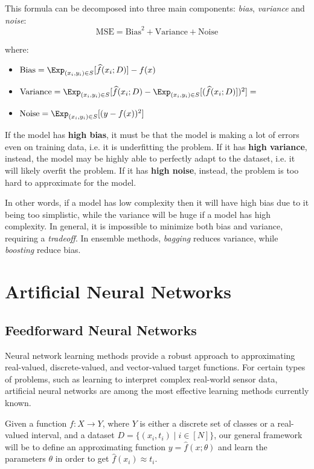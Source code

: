 \documentclass[a4paper, 12pt]{report}
\begin{document}
    This formula can be decomposed into three main components: \textit{bias}, \textit{variance} and \textit{noise}:
    \[\mathrm{MSE} = \mathrm{Bias}^2 + \mathrm{Variance} + \mathrm{Noise}\]

    where:
    \begin{itemize}
        \item $\mathrm{Bias} = \Exp_{(x_i, y_i) \in S}[\widehat{f}(x_i; D)] - f(x)$
        \item $\mathrm{Variance} = \Exp_{(x_i, y_i) \in S}[\widehat{f}(x_i; D) - \Exp_{(x_i, y_i) \in S}[(\widehat{f}(x_i; D)])^2] =$
        \item $\mathrm{Noise} = \Exp_{(x_i, y_i) \in S}[(y-f(x))^2]$
    \end{itemize}

    If the model has \textbf{high bias}, it must be that the model is making a lot of errors even on training data, i.e. it is underfitting the problem. If it has \textbf{high variance}, instead, the model may be highly able to perfectly adapt to the dataset, i.e. it will likely overfit the problem. If it has \textbf{high noise}, instead, the problem is too hard to approximate for the model.
    
    In other words, if a model has low complexity then it will have high bias due to it being too simplistic, while the variance will be huge if a model has high complexity. In general, it is impossible to minimize both bias and variance, requiring a \textit{tradeoff}. In ensemble methods, \textit{bagging} reduces variance, while \textit{boosting} reduce bias.

    \chapter{Artificial Neural Networks}

    \section{Feedforward Neural Networks}

    Neural network learning methods provide a robust approach to approximating real-valued, discrete-valued, and vector-valued target functions. For certain types of problems, such as learning to interpret complex real-world sensor data, artificial neural networks are among the most effective learning methods currently known.

    Given a function $f : X \to Y$, where $Y$ is either a discrete set of classes or a real-valued interval, and a dataset $D = \{(x_i, t_i) \mid i \in [N]\}$, our general framework will be to define an approximating function $y = \widehat{f}(x; \theta)$ and learn the parameters $\theta$ in order to get $\widehat{f}(x_i) \approx t_i$.
\end{document}
